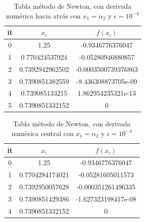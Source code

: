 \documentclass{article} %
\begin{document}
\begin{table}[H]
\centering
\begin{tabular}{|c|c|c|}
\hline
it & $x_i$ & $f(x_i)$\\
\hline
0 & 1.25 & -0.9346776376047\\
1 & 0.770424537924 & -0.05280946880857\\
2 & 0.7392942962502 & -0.0003500739376863\\
3 & 0.7390851382559 & -8.436308873705e-09\\
4 & 0.739085133215 & 1.862954235321e-13\\
5 & 0.7390851332152 & 0\\
\hline
\end{tabular}
\caption{Tabla método de Newton, con derivada numérica hacia atrás con $x_1 = \alpha_2$ y $\epsilon = 10^{-4}$}
\end{table}

\begin{table}[H]
\centering
\begin{tabular}{|c|c|c|}
\hline
it & $x_i$ & $f(x_i)$\\
\hline
0 & 1.25 & -0.9346776376047\\
1 & 0.7704284174021 & -0.05281605011573\\
2 & 0.7392950057628 & -0.000351261496335\\
3 & 0.7390851429386 & -1.627323198417e-08\\
4 & 0.7390851332152 & 0\\
\hline
\end{tabular}
\caption{Tabla método de Newton, con derivada numérica central con $x_1 = \alpha_2$ y $\epsilon = 10^{-4}$}
\end{table}

\end{document}
